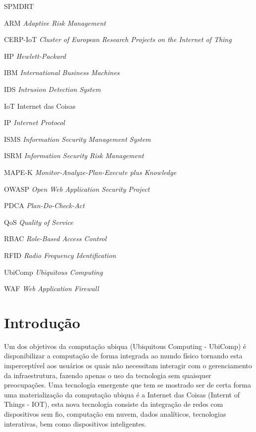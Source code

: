 \documentclass[tid,table]{texufpel} %
\begin{document}
\listoffigures

\listoftables

\begin{listofabbrv}{SPMDRT}
	\item[ARM] \textit{Adaptive Risk Management}
        \item[CERP-IoT] \textit{Cluster of European Research Projects on the Internet of Thing}
	\item[HP] \textit{Hewlett-Packard}
        \item[IBM] \textit{International Business Machines}
        \item[IDS] \textit{Intrusion Detection System}
	\item[IoT] Internet das Coisas
        \item[IP] \textit{Internet Protocol}
        \item[ISMS] \textit{Information Security Management System}
        \item[ISRM] \textit{Information Security Risk Management}
        \item[MAPE-K] \textit{Monitor-Analyze-Plan-Execute plus Knowledge}
        \item[OWASP] \textit{Open Web Application Security Project}
        \item[PDCA] \textit{Plan-Do-Check-Act}
        \item[QoS] \textit{Quality of Service}
        \item[RBAC] \textit{Role-Based Access Control}
        \item[RFID] \textit{Radio Frequency Identification}
	\item[UbiComp] \textit{Ubiquitous Computing}
        \item[WAF] \textit{Web Application Firewall} 
\end{listofabbrv}

\tableofcontents

\chapter{Introdução}

Um dos objetivos da computação ubiqua (Ubiquitous Computing - UbiComp) é disponibilizar a computação de forma integrada ao mundo físico tornando esta imperceptível aos usuários os quais não necessitam interagir com o gerenciamento da infraestrutura, fazendo apenas o uso da tecnologia sem quaisquer preocupações. Uma tecnologia emergente que tem se mostrado ser de certa forma uma materialização da computação ubiqua é a Internet das Coisas (Internt of Things - IOT), esta nova tecnologia consiste da integração de redes com dispositivos sem fio, computação em nuvem, dados analíticos, tecnologias interativas,
bem como dispositivos inteligentes. 
\end{document}
